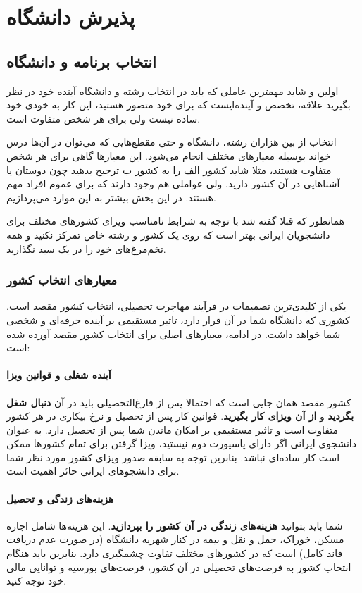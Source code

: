 \chapter{پذیرش دانشگاه}\label{ch:admission}

\section{انتخاب برنامه و دانشگاه}
اولین و شاید مهمترین عاملی که باید در انتخاب رشته و دانشگاه آینده خود در نظر بگیرید علاقه، تخصص و آینده‌ایست که برای خود متصور هستید، 
این کار به خودی خود ساده نیست ولی برای هر شخص متفاوت است.

انتخاب از بین هزاران رشته، دانشگاه و حتی مقطع‌هایی که می‌توان در آن‌ها درس خواند بوسیله معیار‌های مختلف انجام می‌شود. 
این معیار‌ها گاهی برای هر شخص متفاوت هستند، مثلا شاید کشور الف را به کشور ب ترجیح بدهید چون دوستان یا آشناهایی در آن کشور دارید. ولی عواملی 
هم وجود دارند که برای عموم افراد مهم هستند. در این بخش بیشتر به این موارد می‌پردازیم. 

همانطور که قبلا گفته شد با توجه به شرابط نامناسب ویزای کشور‌های مختلف برای دانشجویان ایرانی بهتر است که روی یک کشور و رشته خاص تمرکز نکنید و همه 
تخم‌مرغ‌های خود را در یک سبد نگذارید. 

\subsection{معیارهای انتخاب کشور}
یکی از کلیدی‌ترین تصمیمات در فرآیند مهاجرت تحصیلی، انتخاب کشور مقصد است. کشوری که دانشگاه شما در آن قرار دارد،
 تاثیر مستقیمی بر آینده حرفه‌ای و شخصی شما خواهد داشت. در ادامه، معیارهای اصلی برای انتخاب کشور مقصد آورده شده است:

\subsubsection{آینده شغلی و قوانین ویزا}
کشور مقصد همان جایی است که احتمالا پس از فارغ‌التحصیلی باید در آن \textbf{دنبال شغل بگردید} و \textbf{از آن ویزای کار بگیرید}.
قوانین کار پس از تحصیل و نرخ بیکاری در هر کشور متفاوت است و تاثیر مستقیمی بر امکان ماندن شما پس از تحصیل دارد.
به عنوان دانشجوی ایرانی اگر دارای پاسپورت دوم نیستید، ویزا گرفتن برای تمام کشورها ممکن است کار ساده‌ای نباشد. بنابرین 
توجه به سابقه صدور ویزای کشور مورد نظر شما برای دانشجوهای ایرانی حائز اهمیت است. 

\subsubsection{هزینه‌های زندگی و تحصیل}
شما باید بتوانید \textbf{هزینه‌های زندگی در آن کشور را بپردازید}. این هزینه‌ها
شامل اجاره مسکن، خوراک، حمل و نقل و بیمه در کنار شهریه دانشگاه (در صورت عدم دریافت فاند کامل) 
است که در کشورهای مختلف تفاوت چشمگیری دارد. بنابرین باید هنگام انتخاب کشور به فرصت‌های تحصیلی در آن کشور، فرصت‌های بورسیه و 
توانایی مالی خود توجه کنید. 


